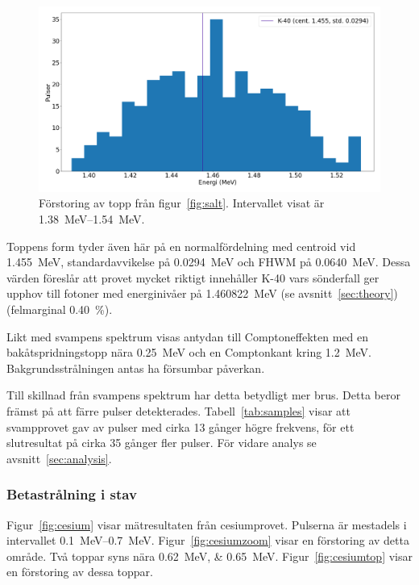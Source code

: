 \begin{figure}[!hp]
    \centering
    \includegraphics[width=\textwidth, keepaspectratio]{../images/salt_top.png}
    \caption{
        Förstoring av topp från figur~\ref{fig:salt}.
        Intervallet visat är \qtyrange{1.38}{1.54}{\MeV}.
    }
    \label{fig:salttop}
\end{figure}

Toppens form tyder även här på en normalfördelning med centroid vid
\qty{1.455}{\MeV}, standardavvikelse på \qty{0.0294}{\MeV} och FHWM på
\qty{0.0640}{\MeV}. Dessa värden föreslår att provet mycket riktigt innehåller
K-40 vars sönderfall ger upphov till fotoner med energinivåer på
\qty{1.460822}{\MeV} (se avsnitt~\ref{sec:theory}) (felmarginal
\qty{0.40}{\percent}).

Likt med svampens spektrum visas antydan till Comptoneffekten med en
bakåtspridningstopp nära \qty{0.25}{\MeV} och en Comptonkant kring
\qty{1.2}{\MeV}. Bakgrundsstrålningen antas ha försumbar påverkan.

Till skillnad från svampens spektrum har detta betydligt mer brus. Detta beror
främst på att färre pulser detekterades. Tabell~\ref{tab:samples} visar att
svampprovet gav av pulser med cirka \num{13} gånger högre frekvens, för ett
slutresultat på cirka \num{35} gånger fler pulser. För vidare analys se
avsnitt~\ref{sec:analysis}.

\subsubsection{Betastrålning i stav} \label{sec:cesium}

Figur~\ref{fig:cesium} visar mätresultaten från cesiumprovet. Pulserna är
mestadels i intervallet \qtyrange{0.1}{0.7}{\MeV}. Figur~\ref{fig:cesiumzoom}
visar en förstoring av detta område. Två toppar syns nära
\qtylist{0.62;0.65}{\MeV}. Figur~\ref{fig:cesiumtop} visar en förstoring av
dessa toppar.

